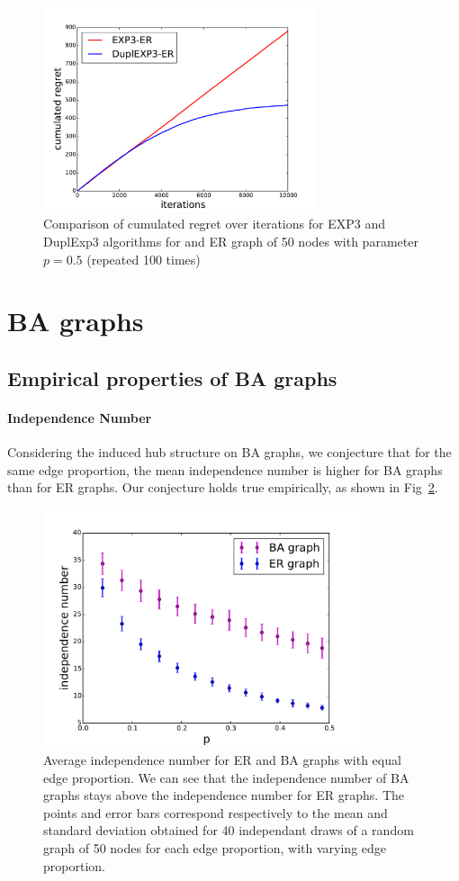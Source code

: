 \documentclass[10pt,a4paper]{scrartcl}
\begin{document}
\begin{figure}[h!]
\centering
\includegraphics[height=6cm]{figures/50new_dupl_big_r05.pdf}
\caption{Comparison of cumulated regret over iterations for EXP3 and DuplExp3 algorithms for and ER graph of 50 nodes with parameter $p=0.5$ (repeated 100 times)}
\label{duplexp3vsexp3ER}
\end{figure}

\section{BA graphs}
\subsection{Empirical properties of BA graphs}
\paragraph{Independence Number}
Considering the induced hub structure on BA graphs, we conjecture that for the same edge proportion, the mean independence number is higher for BA graphs than for ER graphs.  Our conjecture holds true empirically, as shown in Fig~\ref{mean_alpha_ba_er}. 

\begin{figure}[h!]
\centering
 \includegraphics[height=7cm]{figures/independance_number_com.pdf}
 \caption{Average independence number for ER and BA graphs with equal edge proportion. We can see that the independence number of BA graphs stays above the independence number for ER graphs. The points and error bars correspond respectively to the mean and standard deviation obtained for 40 independant draws of a random graph of 50 nodes for each edge proportion, with varying edge proportion.}
 \label{mean_alpha_ba_er}
\end{figure}
\end{document}
